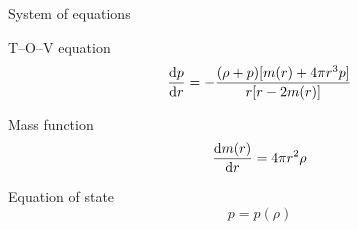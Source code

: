 \documentclass{beamer}
\let\svthefootnote\thefootnote
\newcommand\blankfootnote[1]{%
  \let\thefootnote\relax\footnotetext{#1}%
  \let\thefootnote\svthefootnote%
}
\begin{document}
\begin{frame}{System of equations}

\begin{block}{T--O--V equation}
\begin{displaymath}
  \dv{p}{r} =
 -\frac{(\rho + p) [m(r) + 4 \pi r^3 p]}{r [r - 2m(r)]}
\end{displaymath}
\end{block}

\begin{block}{Mass function}
\begin{displaymath}
  \dv{m(r)}{r} = 4 \pi r^2 \rho
\end{displaymath}
\end{block}

\begin{block}{Equation of state}
\begin{displaymath}
  p = p(\rho)
\end{displaymath}
\end{block}

\blankfootnote{\textcite[pp. 261--262, 264]{Schutz}}



\end{frame}


\end{document}
